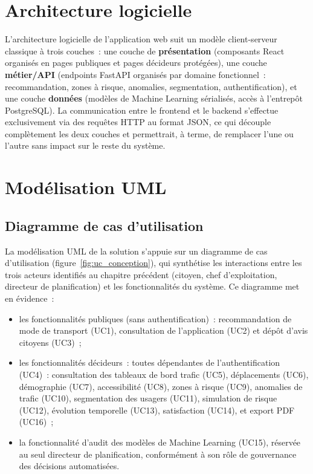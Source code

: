 \section{Architecture logicielle}
L'architecture logicielle de l'application web suit un modèle client-serveur classique à trois couches~: une couche de \textbf{présentation} (composants React organisés en pages publiques et pages décideurs protégées), une couche \textbf{métier/API} (endpoints FastAPI organisés par domaine fonctionnel~: recommandation, zones à risque, anomalies, segmentation, authentification), et une couche \textbf{données} (modèles de Machine Learning sérialisés, accès à l'entrepôt PostgreSQL). La communication entre le frontend et le backend s'effectue exclusivement via des requêtes HTTP au format JSON, ce qui découple complètement les deux couches et permettrait, à terme, de remplacer l'une ou l'autre sans impact sur le reste du système.

\section{Modélisation UML}

\subsection{Diagramme de cas d'utilisation}
La modélisation UML de la solution s'appuie sur un diagramme de cas d'utilisation (figure~\ref{fig:uc_conception}), qui synthétise les interactions entre les trois acteurs identifiés au chapitre précédent (citoyen, chef d'exploitation, directeur de planification) et les fonctionnalités du système. Ce diagramme met en évidence~:

\begin{itemize}
\item les fonctionnalités publiques (sans authentification)~: recommandation de mode de transport (UC1), consultation de l'application (UC2) et dépôt d'avis citoyens (UC3)~;
\item les fonctionnalités décideurs~: toutes dépendantes de l'authentification (UC4)~: consultation des tableaux de bord trafic (UC5), déplacements (UC6), démographie (UC7), accessibilité (UC8), zones à risque (UC9), anomalies de trafic (UC10), segmentation des usagers (UC11), simulation de risque (UC12), évolution temporelle (UC13), satisfaction (UC14), et export PDF (UC16)~;
\item la fonctionnalité d'audit des modèles de Machine Learning (UC15), réservée au seul directeur de planification, conformément à son rôle de gouvernance des décisions automatisées.
\end{itemize}

